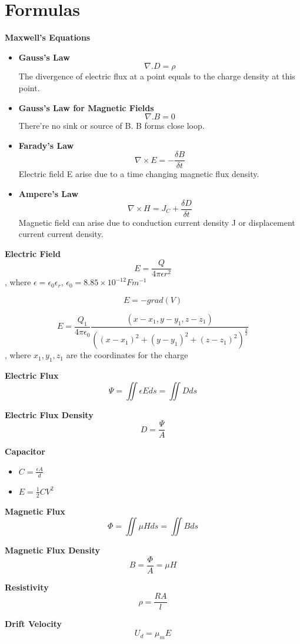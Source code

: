 \documentclass{article}
\begin{document}
\normalsize
  \section{Formulas}
  \textbf{Maxwell's Equations}
\begin{itemize}
\item \textbf{Gauss's Law}  $$ \nabla .D = \rho $$
The divergence of electric flux at a point equals to the charge density at this point.
\item \textbf{Gauss's Law for Magnetic Fields}   $$\nabla .B = 0$$
There're no sink or source of B. B forms close loop.
\item  \textbf{Farady's Law}  $$\nabla \times E = -\frac{\delta B}{\delta t}$$
Electric field E arise due to a time changing magnetic flux density.
\item  \textbf{Ampere's Law}  $$\nabla \times H = J_C + \frac{\delta D}{\delta t}$$
Magnetic field can arise due to conduction current density J or displacement current current density.
\end{itemize}
  \textbf{Electric Field}
  $$E = \frac{Q}{4\pi \epsilon r^2}$$, where $\epsilon = \epsilon_0 \epsilon_r$, $\epsilon_0 = 8.85 \times 10^{-12}Fm^{-1}$
  
  $$E = -grad(V)$$

  $$E = \frac{Q_1}{4\pi\epsilon_0}\frac{(x-x_1,y-y_1,z-z_1)}{((x-x_1)^2+(y-y_1)^2+(z-z_1)^2)^\frac{3}{2}}$$, where $x_1,y_1,z_1$ are the coordinates for the charge
  
  \textbf{Electric Flux}
  $$\Psi = \iint\epsilon E ds = \iint Dds $$
  
  
  \textbf{Electric Flux Density}
  $$D = \frac{\Psi}{A}$$

  \textbf{Capacitor}
  \begin{itemize}
  \item $ C = \frac{\epsilon A}{d}$
  \item $E = \frac{1}{2}CV^2$
  \end{itemize}      
  
  \textbf{Magnetic Flux}
  $$ \Phi = \iint \mu Hds = \iint Bds $$
  
  \textbf{Magnetic Flux Density}
  $$B = \frac{\Phi}{A} = \mu H$$
  
  
  \textbf{Resistivity}
  $$\rho = \frac{RA}{l}$$
  
  \textbf{Drift Velocity}
  $$U_d = \mu_m E$$
  
\end{document}
